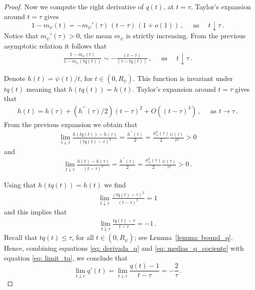 \documentclass[11pt,a4paper,leqno]{amsart}
\theoremstyle{plain}
\theoremstyle{definition}
\numberwithin{equation}{section}
\begin{document}
\begin{proof}
		Now we compute the right derivative of $q(t)$,  at $t = \tau$. Taylor’s expansion around \(t=\tau\) gives
		\[
		1-m_{\psi}(t) = -m_{\psi}'(\tau)\,(t-\tau)\,(1+o(1))\,, 
		\quad \text{ as } \quad t\downarrow\tau\,.
		\]
	  Notice that \(m_{\psi}'(\tau)>0\), the mean $m_{\psi}$ is strictly increasing. From the previous asymptotic relation it follows that
		\begin{align}
			\label{eq: medias_q_cociente}
			\frac{1-m_{\psi}(t)}{1-m_{\psi}(tq(t))}
			\sim -\frac{(t-\tau)}{(\tau-tq(t))}\,, 
			\quad \text{ as } \quad t\downarrow\tau\,.
		\end{align}
		
		Denote $h(t) = \psi(t)/t$, for $t \in (0,R_{\psi})$. This function is invariant under $tq(t)$ meaning that $h(tq(t)) = h(t)$. Taylor's expansion around $t = \tau$ gives that 
		\begin{align*}
			h(t) = h(\tau)+(h^{\prime\prime}(\tau)/2)(t-\tau)^2 +O((t-\tau)^3)\,, \quad \text{ as } t \rightarrow \tau\,.
		\end{align*}
		From the previous expansion we obtain that
		\begin{align*}
			\lim_{t \downarrow \tau}\frac{h(tq(t))-h(\tau)}{(tq(t)-\tau)^2} = \frac{h^{\prime\prime}(\tau)}{2} = \frac{\sigma_{\psi}^2(\tau)}{2}\frac{\psi(\tau)}{\tau^3}>0
		\end{align*}
		and
		\begin{align*}
			\lim_{t \downarrow \tau}\frac{h(t)-h(\tau)}{(t-\tau)^2} = \frac{h^{\prime\prime}(\tau)}{2} = \frac{\sigma_{\psi}^2(\tau)}{2}\frac{\psi(\tau)}{\tau^3}>0\,.
		\end{align*}
		\smallskip
		
		Using that $h(tq(t)) = h(t)$ we find  
		\begin{align*}
			\lim_{t \downarrow \tau}\frac{(tq(t)-\tau)^2}{(t-\tau)^2} = 1
		\end{align*}
		and this implies that 
		\begin{align}\label{eq: limit_tq}
			\lim_{t \downarrow \tau}\frac{tq(t)-\tau}{t-\tau} = -1\,.
		\end{align}
		Recall that $tq(t) \leq \tau$, for all $t \in (0, R_\psi)$; see Lemma~\ref{lemma: bound_q}. Hence, combining equations \eqref{eq: derivada_q} and \eqref{eq: medias_q_cociente} with equation \eqref{eq: limit_tq}, we conclude that 
		\[
		\lim_{t\downarrow\tau}q'(t)
		=\lim_{t\downarrow\tau}\frac{q(t)-1}{t-\tau}
		=-\frac{2}{\tau}\,.
		\]
	\end{proof}
	
\end{document}
